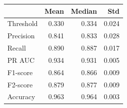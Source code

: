 \begin{tabular}{lrrr}
\toprule
 & Mean & Median & Std \\
\midrule
Threshold & 0.330 & 0.334 & 0.024 \\
Precision & 0.841 & 0.833 & 0.028 \\
Recall & 0.890 & 0.887 & 0.017 \\
PR AUC & 0.934 & 0.931 & 0.005 \\
F1-score & 0.864 & 0.866 & 0.009 \\
F2-score & 0.879 & 0.877 & 0.009 \\
Accuracy & 0.963 & 0.964 & 0.003 \\
\bottomrule
\end{tabular}
